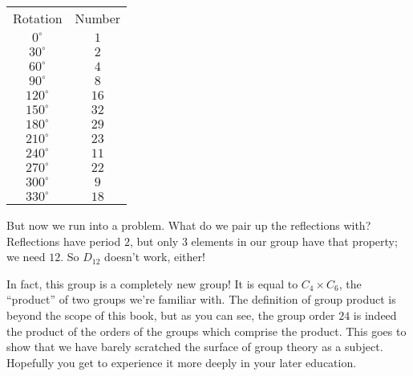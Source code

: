 \documentclass[../gatm.tex]{subfiles}
\begin{document}
\begin{center}
\begin{tabular}{|c|c|}
Rotation & Number \\
$0^\circ$ & $1$ \\
$30^\circ$ & $2$ \\
$60^\circ$ & $4$ \\
$90^\circ$ & $8$ \\
$120^\circ$ & $16$ \\
$150^\circ$ & $32$ \\
$180^\circ$ & $29$ \\
$210^\circ$ & $23$ \\
$240^\circ$ & $11$ \\
$270^\circ$ & $22$ \\
$300^\circ$ & $9$ \\
$330^\circ$ & $18$ \\
\end{tabular}
\end{center}

But now we run into a problem. What do we pair up the reflections with? Reflections have period $2$, but only $3$ elements in our group have that property; we need $12$. So $D_{12}$ doesn't work, either!

In fact, this group is a completely new group! It is equal to $C_4\times C_6$, the ``product'' of two groups we're familiar with. The definition of group product is beyond the scope of this book, but as you can see, the group order $24$ is indeed the product of the orders of the groups which comprise the product. This goes to show that we have barely scratched the surface of group theory as a subject. Hopefully you get to experience it more deeply in your later education.
\end{document}
